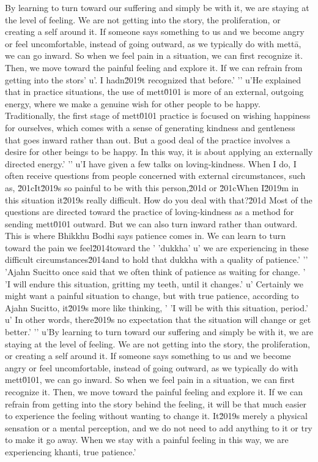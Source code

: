 By learning to turn toward our suffering and simply be with it, we are 
staying at the level of feeling. We are not getting into the story, the 
proliferation, or creating a self around it. If someone says something 
to us and we become angry or feel uncomfortable, instead of going 
outward, as we typically do with mettā, we can go inward. So when we 
feel pain in a situation, we can first recognize it. Then, we move 
toward the painful feeling and explore it. If we can refrain from 
getting into the stors'
u'. I hadn\u2019t recognized that before.'
'\n'
u'He explained that in practice situations, the use of mett\u0101 is more of an external, outgoing energy, where we make a genuine wish for other people to be happy. Traditionally, the first stage of mett\u0101 practice is focused on wishing happiness for ourselves, which comes with a sense of generating kindness and gentleness that goes inward rather than out. But a good deal of the practice involves a desire for other beings to be happy. In this way, it is about applying an externally directed energy.'
'\n'
u'I have given a few talks on loving-kindness. When I do, I often receive questions from people concerned with external circumstances, such as, \u201cIt\u2019s so painful to be with this person,\u201d or \u201cWhen I\u2019m in this situation it\u2019s really difficult. How do you deal with that?\u201d Most of the questions are directed toward the practice of loving-kindness as a method for sending mett\u0101 outward. But we can also turn inward rather than outward. This is where Bhikkhu Bodhi says patience comes in. We can learn to turn toward the pain we feel\u2014toward the '
'dukkha'
u' we are experiencing in these difficult circumstances\u2014and to hold that dukkha with a quality of patience.'
'\n'
'Ajahn Sucitto once said that we often think of patience as waiting for change. '
'I will endure this situation, gritting my teeth, until it changes.'
u' Certainly we might want a painful situation to change, but with true patience, according to Ajahn Sucitto, it\u2019s more like thinking, '
'I will be with this situation, period.'
u' In other words, there\u2019s no expectation that the situation will change or get better.'
'\n'
u'By learning to turn toward our suffering and simply be with it, we are staying at the level of feeling. We are not getting into the story, the proliferation, or creating a self around it. If someone says something to us and we become angry or feel uncomfortable, instead of going outward, as we typically do with mett\u0101, we can go inward. So when we feel pain in a situation, we can first recognize it. Then, we move toward the painful feeling and explore it. If we can refrain from getting into the story behind the feeling, it will be that much easier to experience the feeling without wanting to change it. It\u2019s merely a physical sensation or a mental perception, and we do not need to add anything to it or try to make it go away. When we stay with a painful feeling in this way, we are experiencing khanti, true patience.'
